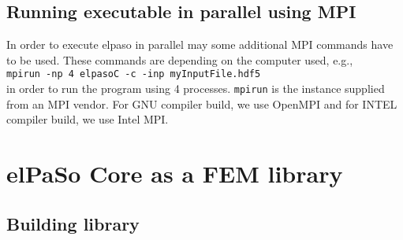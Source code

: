 \subsection{Running executable in parallel using MPI}
In order to execute elpaso in parallel may some additional MPI commands have to be used. These commands
are depending on the computer used, e.g.,\\

{\hspace{2em} \tt mpirun -np 4 elpasoC -c -inp myInputFile.hdf5}\\

in order to run the program using 4 processes. \texttt{mpirun} is the instance supplied from an MPI vendor. For GNU compiler build, we use OpenMPI and for INTEL compiler build, we use Intel MPI.

\section{elPaSo Core as a FEM library} \label{sec:eCoreAsLibrary}
\subsection{Building library}

